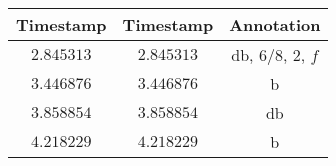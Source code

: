 \begin{tabular}{ccc}
    Timestamp  & Timestamp  & Annotation          \\\hline
    $2.845313$ & $2.845313$ & db, $6/8$, $2$, $f$ \\
    $3.446876$ & $3.446876$ & b                   \\
    $3.858854$ & $3.858854$ & db                  \\
    $4.218229$ & $4.218229$ & b
\end{tabular}
